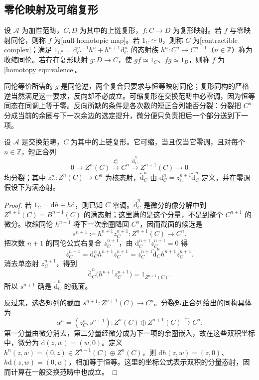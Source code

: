 \subsection{零伦映射及可缩复形}
\label{b4:subsec:0601:02}

\begin{definition}\label{b4:def:contractible-complex}
	设 \(\mathcal A\) 为加性范畴，\(C,D\) 为其中的上链复形，\(f:C\to D\) 为复形映射。若 \(f\) 与零映射同伦，则称 \(f\) 为[null-homotopic map]。若 \(1_C\simeq0\)，则称 \(C\) 为[contractible complex]；满足 \(1_{C^n}=\mathrm{d}_C^{n-1}h^n+h^{n+1}\mathrm{d}_C^n\) 的态射族 \(h^n:C^n\to C^{n-1}\)（\(n\in\mathbb Z\)）称为收缩同伦。若存在复形映射 \(g:D\to C\)，使 \(gf\simeq1_C\)、\(fg\simeq1_D\)，则称 \(f\) 为[homotopy equivalence]。
\end{definition}

同伦等价所需的 \(g\) 是同伦逆，两个复合只要求与恒等映射同伦；复形同构的严格逆当然满足这一要求，反向却不必成立。可缩复形在交换范畴中必零调，因为恒等同态在同调上等于零。反向所缺的条件是各次数的短正合列能否分裂：分裂把 \(C^n\) 分成当前的余圈与下一次余边的选定提升，微分便只负责把后一个部分送到下一项。

\begin{proposition}\label{b4:prop:contractible-split-exact}
	设 \(\mathcal A\) 是交换范畴，\(C\) 为其中的上链复形。它可缩，当且仅当它零调，且对每个 \(n\in\mathbb Z\)，短正合列
	\[
		0\longrightarrow Z^n(C)\xrightarrow{z_C^n}C^n \xrightarrow{\widetilde{\mathrm{d}}_C^n} Z^{n+1}(C)\longrightarrow0
	\]
	均分裂；其中 \(z_C^n:Z^n(C)\to C^n\) 为核态射，\(\widetilde{\mathrm{d}}_C^n\) 由 \(\mathrm{d}_C^n=z_C^{n+1}\widetilde{\mathrm{d}}_C^n\) 定义，并在零调假设下为满态射。
\end{proposition}
\begin{proof}
	若 \(1_C=\mathrm{d}h+h\mathrm{d}\)，则已知 \(C\) 零调。\(\widetilde{\mathrm{d}}_C^n\) 是微分的像分解中到 \(Z^{n+1}(C)=B^{n+1}(C)\) 的满态射；这里满的是这个分量，不是到整个 \(C^{n+1}\) 的微分。收缩同伦 \(h^{n+1}\) 将下一次余圈降回 \(C^n\)，因而截面的候选是
	\[
		s^{n+1}\coloneqq h^{n+1}z_C^{n+1}:Z^{n+1}(C)\longrightarrow C^n.
	\]
	把次数 \(n+1\) 的同伦公式右复合 \(z_C^{n+1}\)，由 \(\mathrm{d}_C^{n+1}z_C^{n+1}=0\) 得
	\[
		z_C^{n+1}=\mathrm{d}_C^nh^{n+1}z_C^{n+1} =z_C^{n+1}\widetilde{\mathrm{d}}_C^nh^{n+1}z_C^{n+1}.
	\]
	消去单态射 \(z_C^{n+1}\)，得到
	\[
		\widetilde{\mathrm{d}}_C^n\bigl(h^{n+1}z_C^{n+1}\bigr) =1_{Z^{n+1}(C)}.
	\]
	所以 \(s^{n+1}\) 确是 \(\widetilde{\mathrm{d}}_C^n\) 的截面。

	反过来，选各短列的截面 \(s^{n+1}:Z^{n+1}(C)\to C^n\)。分裂短正合列给出的同构具体为
	\[
		\alpha^n=(z_C^n,s^{n+1}):Z^n(C)\oplus Z^{n+1}(C)\xrightarrow{\sim}C^n.
	\]
	第一分量由微分消去，第二分量经微分成为下一项的余圈嵌入，故在这些双积坐标中，微分为 \(\mathrm{d}(z,w)=(w,0)\)。定义 \(h^n(z,w)=(0,z)\in Z^{n-1}(C)\oplus Z^n(C)\)，则 \(\mathrm{d}h(z,w)=(z,0)\)、\(h\mathrm{d}(z,w)=(0,w)\)，相加等于恒等。这里的坐标公式表示双积的分量态射，因而计算在一般交换范畴中也成立。
\end{proof}

